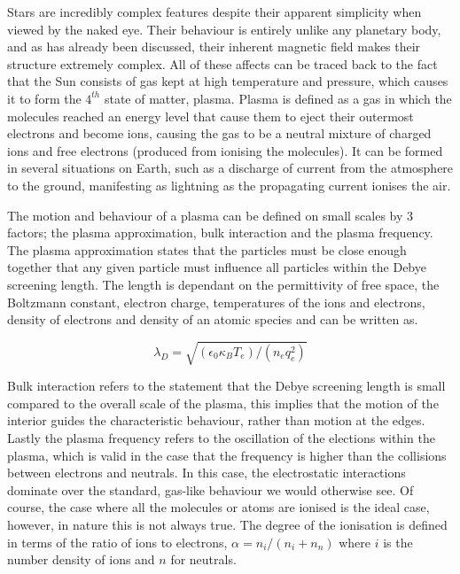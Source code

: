 Stars are incredibly complex features despite their apparent simplicity when viewed by the naked eye.
Their behaviour is entirely unlike any planetary body, and as has already been discussed, their inherent magnetic field makes their structure extremely complex.
All of these affects can be traced back to the fact that the Sun consists of gas kept at high temperature and pressure, which causes it to form the $4^{th}$ state of matter, plasma.
Plasma is defined as a gas in which the molecules reached an energy level that cause them to eject their outermost electrons and become ions, causing the gas to be a neutral mixture of charged ions and free electrons (produced from ionising the molecules).
It can be formed in several situations on Earth, such as a discharge of current from the atmosphere to the ground, manifesting as lightning as the propagating current ionises the air.

The motion and behaviour of a plasma can be defined on small scales by 3 factors; the plasma approximation, bulk interaction and the plasma frequency.
The plasma approximation states that the particles must be close enough together that any given particle must influence all particles within the Debye screening length.
The length is dependant on the permittivity of free space, the Boltzmann constant, electron charge, temperatures of the ions and electrons, density of electrons and density of an atomic species and can be written as.

\begin{equation}
	\lambda_D = \sqrt{(\epsilon_0\kappa_BT_e)/(n_eq_e^2)}
\end{equation}

Bulk interaction refers to the statement that the Debye screening length is small compared to the overall scale of the plasma, this implies that the motion of the interior guides the characteristic behaviour, rather than motion at the edges.
Lastly the plasma frequency refers to the oscillation of the elections within the plasma, which is valid in the case that the frequency is higher than the collisions between electrons and neutrals.
In this case, the electrostatic interactions dominate over the standard, gas-like behaviour we would otherwise see.
Of course, the case where all the molecules or atoms are ionised is the ideal case, however, in nature this is not always true.
The degree of the ionisation is defined in terms of the ratio of ions to electrons, $\alpha = n_i/(n_i + n_n)$ where $i$ is the number density of ions and $n$ for neutrals.

